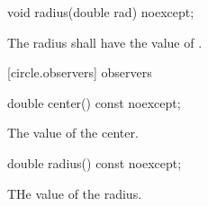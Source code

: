 \begin{itemdecl}
void radius(double rad) noexcept;
\end{itemdecl}
\begin{itemdescr}
	\pnum
	\effects
	The radius shall have the value of .
\end{itemdescr}

 [circle.observers]{ observers}

\begin{itemdecl}
double center() const noexcept;
\end{itemdecl}
\begin{itemdescr}
	\pnum
	\returns
	The value of the center.
\end{itemdescr}

\begin{itemdecl}
double radius() const noexcept;
\end{itemdecl}
\begin{itemdescr}
	\pnum
	\returns
	THe value of the radius.
\end{itemdescr}
